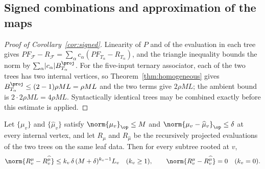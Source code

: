 \subsection{Signed combinations and approximation of the maps}

\begin{proof}[Proof of Corollary~\ref{cor:signed}]
Linearity of $P$ and of the evaluation in each tree gives
$PF_{\mathcal F}-R_{\mathcal F}=\sum_\alpha c_\alpha(PF_{T_\alpha}-R_{T_\alpha})$, and the
triangle inequality bounds the norm by
$\sum_\alpha\lvert c_\alpha\rvert B^{\proj}_{T_\alpha}$. For the five-input ternary
associator, each of the two trees has two internal vertices, so
Theorem~\ref{thm:homogeneous} gives $B^{\proj}_{T_\alpha}\le(2-1)\rho ML=\rho ML$ and the
two terms give $2\rho ML$; the ambient bound is $2\cdot2\rho ML=4\rho ML$. Syntactically
identical trees may be combined exactly before this estimate is applied.
\end{proof}

\begin{lemma}
\label{lem:sensitivity}
Let $\{\mu_v\}$ and $\{\widehat\mu_v\}$ satisfy $\norm{\mu_v}_\op\le M$ and
$\norm{\mu_v-\widehat\mu_v}_\op\le\delta$ at every internal vertex, and let $R_\mu$ and
$R_{\widehat\mu}$ be the recursively projected evaluations of the two trees on the same
leaf data. Then for every subtree rooted at $v$,
\[
 \norm{R^{\mu}_v-R^{\widehat\mu}_v}\le k_v\,\delta\,(M+\delta)^{k_v-1}L_v
 \quad(k_v\ge1),
 \qquad
 \norm{R^{\mu}_v-R^{\widehat\mu}_v}=0
 \quad(k_v=0).
\]
\end{lemma}

